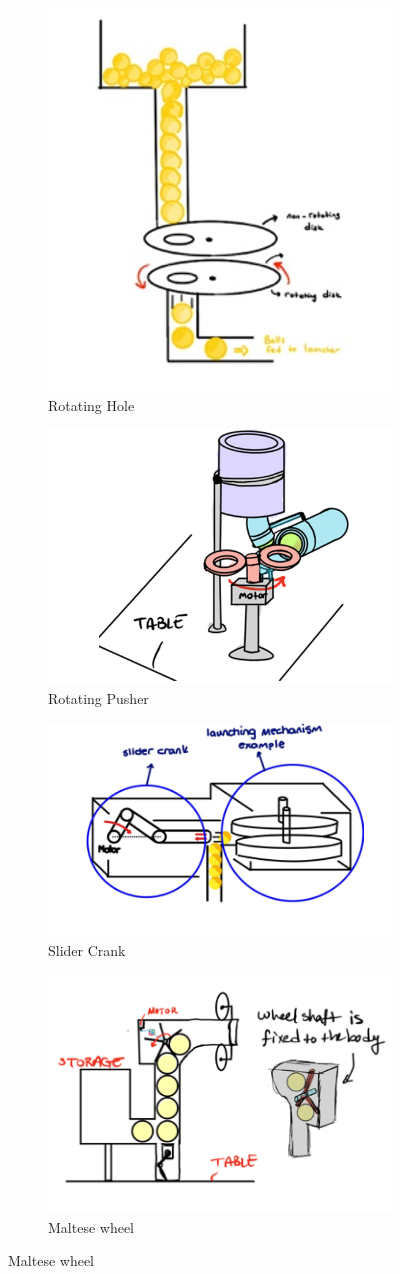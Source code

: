 \documentclass[12pt]{article}
\begin{document}
\begin{figure}[H]
\centering
\begin{subfigure}{.5\textwidth}
  \centering
  \includegraphics[width=.4\linewidth]{Function photos/rotating hole.png}
  \caption{Rotating Hole}
  \label{fig:rotating_hole}
\end{subfigure}%
\begin{subfigure}{.5\textwidth}
  \centering
  \includegraphics[width=.4\linewidth]{Function photos/Rotating Pusher.png}
  \caption{Rotating Pusher}
  \label{fig:rotating_pusher}
\end{subfigure}
\begin{subfigure}{.5\textwidth}
  \centering
  \includegraphics[width=.4\linewidth]{Function photos/Slider Crank.png}
  \caption{Slider Crank}
  \label{fig:slider_crank}
\end{subfigure}%
\begin{subfigure}{.5\textwidth}
  \centering
  \includegraphics[width=.4\linewidth]{Function photos/maltese 2.png}
  \caption{Maltese wheel}
  \label{fig:maltese_wheel}
\end{subfigure}%


\end{figure}
\end{document}
